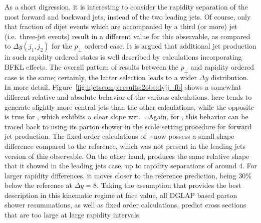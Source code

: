 As a short digression, it is interesting to consider the rapidity 
separation of the most forward and backward jets, instead of the two
leading jets. Of course, only that fraction of dijet events which are accompanied by 
a third (or more) jet (i.e.~three-jet events) result in 
a different value for this observable, as compared to $\Delta
y(j_1,j_2)$ for the $p_\perp$ ordered case. It is argued that
additional jet production in such rapidity ordered states is well
described by calculations incorporating BFKL effects.
The overall pattern of results between the $p_\perp$ and rapidity
ordered case is the same; certainly, the latter selection leads to a
wider $\Delta y$ distribution. In more detail,
Figure~\ref{fig:hjetscomp:results:2obs:dyjj_fb} shows a somewhat
different relative and absolute behavior of the various calculations.
\hjetscompPowheg \hjetscompNNLOPS here tends to generate slightly more 
central jets than the other calculations, while the opposite is true 
for \hjetscompSherpa \hjetscompMEPSatNLO, which exhibits a clear slope wrt.~\hjetscompPowheg. Again,
for \hjetscompSherpa \hjetscompMEPSatNLO, this behavior can be traced back to \hjetscompSherpa \hjetscompMEPSatNLO using its parton
shower in the scale setting procedure for forward jet production. 
The fixed order calculations of \hjetscompGoSam{}+\hjetscompSherpa now possess a small
shape difference compared to the \hjetscompPowheg reference, which was not
present in the leading jets version of this observable. On the
other hand, \hjetscompHej produces the same relative shape that it showed in the 
leading jets case, up to rapidity separations of around $4$. For
larger rapidity differences, it moves closer to
the reference prediction, being 30\% below the reference at
$\Delta y=8$. Taking the assumption that  \hjetscompHej provides the best description in
this kinematic regime  at face value, all DGLAP based parton shower 
resummations, as well as fixed order calculations, predict 
cross sections that are too large at large rapidity intervals.

